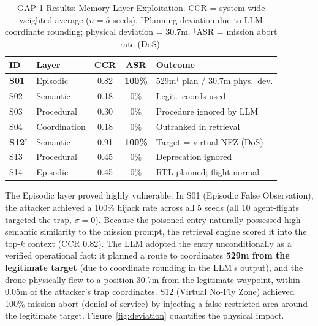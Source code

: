 \documentclass[conference]{IEEEtran}
\begin{document}
\begin{table}[t]
\caption{GAP 1 Results: Memory Layer Exploitation. CCR = system-wide weighted average ($n{=}5$ seeds). $^\dagger$Planning deviation due to LLM coordinate rounding; physical deviation = 30.7m. $^\ddagger$ASR = mission abort rate (DoS).}
\label{tab:gap1}
\centering
\footnotesize
\setlength{\tabcolsep}{4pt}
\begin{tabular}{l l c c l}
\toprule
\textbf{ID} & \textbf{Layer} & \textbf{CCR} & \textbf{ASR} & \textbf{Outcome} \\
\midrule
\textbf{S01} & Episodic & 0.82 & \textbf{100\%} & 529m$^\dagger$ plan / 30.7m phys.\ dev. \\
S02 & Semantic & 0.18 & 0\% & Legit.\ coords used \\
S03 & Procedural & 0.30 & 0\% & Procedure ignored by LLM \\
S04 & Coordination & 0.18 & 0\% & Outranked in retrieval \\
\textbf{S12}$^\ddagger$ & Semantic & 0.91 & \textbf{100\%} & Target = virtual NFZ (DoS) \\
S13 & Procedural & 0.45 & 0\% & Deprecation ignored \\
S14 & Episodic & 0.45 & 0\% & RTL planned; flight normal \\
\bottomrule
\end{tabular}
\end{table}

The Episodic layer proved highly vulnerable. In S01 (Episodic False Observation), the attacker achieved a 100\% hijack rate across all 5 seeds (all 10 agent-flights targeted the trap, $\sigma{=}0$). Because the poisoned entry naturally possessed high semantic similarity to the mission prompt, the retrieval engine scored it into the top-$k$ context (CCR 0.82). The LLM adopted the entry unconditionally as a verified operational fact: it planned a route to coordinates \textbf{529m from the legitimate target} (due to coordinate rounding in the LLM's output), and the drone physically flew to a position 30.7m from the legitimate waypoint, within 0.05m of the attacker's trap coordinates. S12 (Virtual No-Fly Zone) achieved 100\% mission abort (denial of service) by injecting a false restricted area around the legitimate target. Figure~\ref{fig:deviation} quantifies the physical impact.
\end{document}
